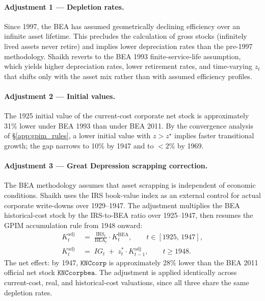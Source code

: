 \paragraph{Adjustment 1 — Depletion rates.}
Since 1997, the BEA has assumed geometrically declining efficiency over
an infinite asset lifetime. This precludes the calculation of gross
stocks (infinitely lived assets never retire) and implies lower
depreciation rates than the pre-1997 methodology. Shaikh reverts to the
BEA 1993 finite-service-life assumption, which yields higher depreciation
rates, lower retirement rates, and time-varying $z_t$ that shifts only
with the asset mix rather than with assumed efficiency profiles.

\paragraph{Adjustment 2 — Initial values.}
The 1925 initial value of the current-cost corporate net stock is
approximately 31\% lower under BEA 1993 than under BEA 2011. By the
convergence analysis of \S\ref{app:gpim_rules}, a lower initial value
with $z > z^{\star}$ implies faster transitional growth; the gap narrows
to 10\% by 1947 and to $<2\%$ by 1969.

\paragraph{Adjustment 3 — Great Depression scrapping correction.}
The BEA methodology assumes that asset scrapping is independent of
economic conditions. Shaikh uses the IRS book-value index
\citep[Series V~115]{UScensus1975} as an external control for actual
corporate write-downs over 1929--1947. The adjustment multiplies the BEA
historical-cost stock by the IRS-to-BEA ratio over 1925--1947, then
resumes the GPIM accumulation rule from 1948 onward:
%
\begin{align}
  K_t^{\mathrm{adj}}
  &\;=\; \frac{\mathrm{IRS}_t}{\mathrm{BEA}_t}\cdot K_t^{\mathrm{BEA}},
  \qquad t \in [1925,\,1947],
  \label{eq:app_irs_adj} \\[4pt]
  K_t^{\mathrm{adj}}
  &\;=\; IG_t \;+\; z_t^{\ast}\cdot K_{t-1}^{\mathrm{adj}},
  \qquad t \geq 1948.
  \label{eq:app_gpim_resume}
\end{align}
%
The net effect: by 1947, $\texttt{KNCcorp}$ is approximately 28\% lower
than the BEA 2011 official net stock $\texttt{KNCcorpbea}$. The
adjustment is applied identically across current-cost, real, and
historical-cost valuations, since all three share the same depletion
rates.

